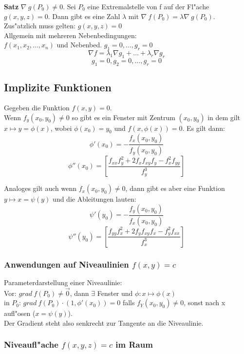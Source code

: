 \documentclass[10pt, a4paper, twocolumn]{scrartcl}
\begin{document}
\textbf{Satz} $\nabla\:g(P_0)\neq 0$. Sei $P_0$ eine Extremalstelle von f auf der Fl"ache $g(x,y,z)=0$. Dann gibt es eine Zahl $\lambda$ mit $\nabla\:f(P_0)=\lambda \nabla\:g(P_0)$.\\
Zus"atzlich muss gelten: $g(x,y,z)=0$\\

Allgemein mit mehreren Nebenbedingungen:\\
$f(x_1,x_2,\ldots,x_n)$ und Nebenbed. $g_1=0,\ldots,g_r=0$\\
$$\nabla f=\lambda_1\nabla g_1 +\ldots +\lambda_r\nabla g_r$$
$$g_1=0,g_2=0,\ldots,g_r=0$$

\subsection{Implizite Funktionen}

Gegeben die Funktion $f(x,y)=0$.\\

Wenn $f_y(x_0,y_0)\neq 0$ so gibt es ein Fenster mit Zentrum $(x_0,y_0)$ in dem gilt $x\mapsto y=\phi(x)$, wobei $\phi(x_0)=y_0$ und $f(x,\phi(x))=0$. Es gilt dann:
$$\phi'(x_0)=-\frac{f_x(x_0,y_0)}{f_y(x_0,y_0)}$$
$$\phi''(x_0)=[\frac{f_{xx}f_{y}^2+2f_{x}f_{xy}f_{y}-f_x^2f_{yy}}{f_y^3}]$$

Analoges gilt auch wenn $f_x(x_0,y_0)\neq 0$, dann gibt es aber eine Funktion $y\mapsto x=\psi(y)$ und die Ableitungen lauten:
$$\psi'(y_0)=-\frac{f_y(x_0,y_0)}{f_x(x_0,y_0)}$$
$$\psi''(y_0)=[\frac{f_{yy}f_{x}^2+2f_{y}f_{xy}f_{x}-f_y^2f_{xx}}{f_x^3}]$$


\subsubsection{Anwendungen auf Niveaulinien $f(x,y)=c$}

Parameterdarstellung einer Niveaulinie:\\
Vor: $grad\:f(P_0)\neq \vec{0}$, dann $\exists$ Fenster und $\phi:x\mapsto\phi(x)$\\
in $P_0$: $grad\:f(P_0)\cdotp(1,\phi'(x_0))=0$ falls $f_Y(x_0,y_0)\neq 0$, sonst nach x aufl"osen ($x=\psi(y)$).\\
Der Gradient steht also senkrecht zur Tangente an die Niveaulinie.


\subsubsection{Niveaufl"ache $f(x,y,z)=c$ im Raum}
\end{document}
